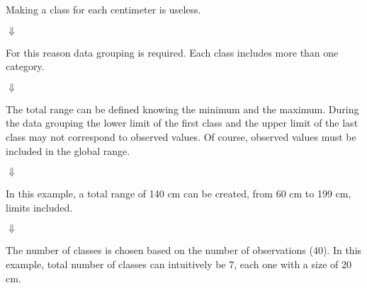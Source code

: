 \begin{frame}
  \begin{small}
    Making a class for each centimeter is useless.
    \vspace*{-.35cm}
    \begin{center} $ \Downarrow $ \end{center}
    \vspace*{-.35cm}
    For this reason data grouping is required. Each class includes more than one category.
    \vspace*{-.35cm}
    \begin{center} $ \Downarrow $ \end{center}
    \vspace*{-.35cm}
    The total range can be defined knowing the minimum and the maximum. During the data grouping the lower limit of the first class and the upper limit of the last class may not correspond to observed values. Of course, observed values must be included in the global range.\vspace*{-.25cm}
    \begin{center} $ \Downarrow $ \end{center}
    \vspace*{-.35cm}
    In this example, a total range of 140 cm can be created, from 60 cm to 199 cm, limits included.
    \vspace*{-.35cm}
    \begin{center} $ \Downarrow $ \end{center}
    \vspace*{-.35cm}
    The number of classes is chosen based on the number of observations (40). In this example, total number of classes can intuitively be 7, each one with a size of 20 cm.
  \end{small}
\end{frame}

